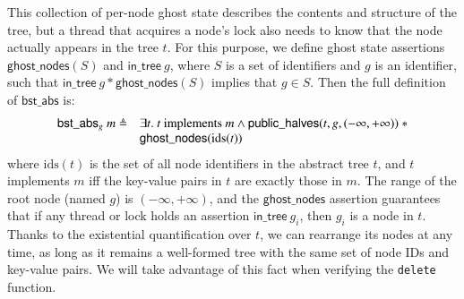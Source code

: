 \documentclass[runningheads]{llncs}
\newcommand{\treerep}{\ensuremath{\mathsf{bst\_abs}}}
\begin{document}
This collection of per-node ghost state describes the contents and structure of the tree, but a thread that acquires a node's lock also needs to know that the node actually appears in the tree $t$. For this purpose, we define ghost state assertions $\mathsf{ghost\_nodes}(S)$ and $\mathsf{in\_tree}\ g$, where $S$ is a set of identifiers and $g$ is an identifier, such that $\mathsf{in\_tree}\ g * \mathsf{ghost\_nodes}(S)$ implies that $g \in S$. Then the full definition of $\treerep$ is:
\[\begin{array}{r l}\treerep_g\ m \triangleq &\exists t.\ t \textrm{ implements } m \land \mathsf{public\_halves}(t, g, (-\infty, +\infty))\ * \\&\mathsf{ghost\_nodes}(\mathrm{ids}(t))\end{array}\]
where $\mathrm{ids}(t)$ is the set of all node identifiers in the abstract tree $t$, and $t$ implements $m$ iff the key-value pairs in $t$ are exactly those in $m$. The range of the root node (named $g$) is $(-\infty, +\infty)$, and the $\mathsf{ghost\_nodes}$ assertion guarantees that if any thread or lock holds an assertion $\mathsf{in\_tree}\ g_i$, then $g_i$ is a node in $t$. Thanks to the existential quantification over $t$, we can rearrange its nodes at any time, as long as it remains a well-formed tree with the same set of node IDs and key-value pairs. We will take advantage of this fact when verifying the \lstinline{delete} function.
\end{document}
